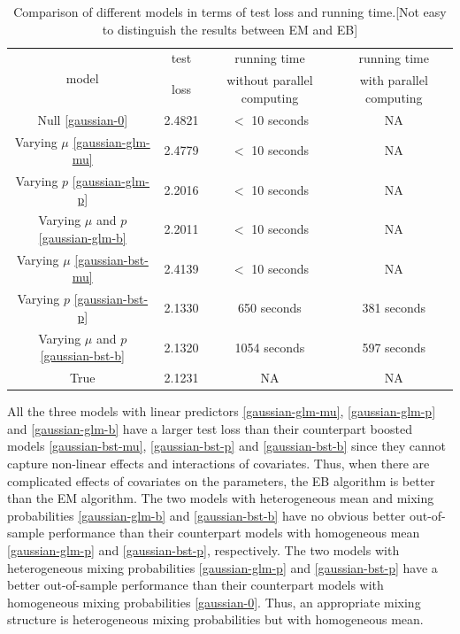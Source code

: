 \documentclass[11pt]{article}
\numberwithin{equation}{section}
\begin{document}
\begin{table}[htp!]
	\caption{Comparison of different models in terms of test loss and running time.{\color{blue}[Not easy to distinguish the results between EM and EB]}}\label{gaussian-summary}
			\centering
	\begin{tabular}{c|ccc}
		\hline
		\multirow{2}{*}{model} & test       & running time               & running time            \\
		& loss & without parallel computing & with parallel computing \\ \hline
		Null \eqref{gaussian-0}                   & 2.4821         & $<$ 10 seconds       & NA    \\
		Varying $\mu$	\eqref{gaussian-glm-mu}                & 2.4779         & $<$ 10 seconds       & NA    \\
		Varying  $p$ \eqref{gaussian-glm-p}                 & 2.2016         & $<$ 10 seconds       & NA   \\
		Varying $\mu$ and $p$ \eqref{gaussian-glm-b}              & 2.2011         & $<$ 10 seconds       & NA   \\
		Varying $\mu$ \eqref{gaussian-bst-mu}                & 2.4139         & $<$ 10 seconds       & NA    \\
		Varying $p$ \eqref{gaussian-bst-p}                 & 2.1330          &            650 seconds                & 381 seconds           \\
		Varying $\mu$ and $p$ \eqref{gaussian-bst-b}              & 2.1320          &              1054 seconds              & 597 seconds               \\
		True                   & 2.1231         &            NA                &               NA         \\ \hline
	\end{tabular}
\end{table}
All the three models with linear predictors  \eqref{gaussian-glm-mu}, \eqref{gaussian-glm-p} and \eqref{gaussian-glm-b} have a larger test loss 
than their counterpart boosted models \eqref{gaussian-bst-mu}, \eqref{gaussian-bst-p} and \eqref{gaussian-bst-b} 
since they cannot capture non-linear effects and interactions of covariates.
Thus, when there are complicated effects of covariates on the parameters, the EB algorithm is better than the EM algorithm.
The two models with heterogeneous mean and mixing probabilities \eqref{gaussian-glm-b} and \eqref{gaussian-bst-b}  have no obvious better out-of-sample performance than their counterpart models with homogeneous mean \eqref{gaussian-glm-p} and \eqref{gaussian-bst-p}, respectively.
The two models with heterogeneous mixing probabilities \eqref{gaussian-glm-p} and \eqref{gaussian-bst-p} have a better out-of-sample performance than their counterpart models with homogeneous mixing probabilities \eqref{gaussian-0}.
Thus, an appropriate mixing structure is heterogeneous mixing probabilities but with homogeneous mean. 
\end{document}
